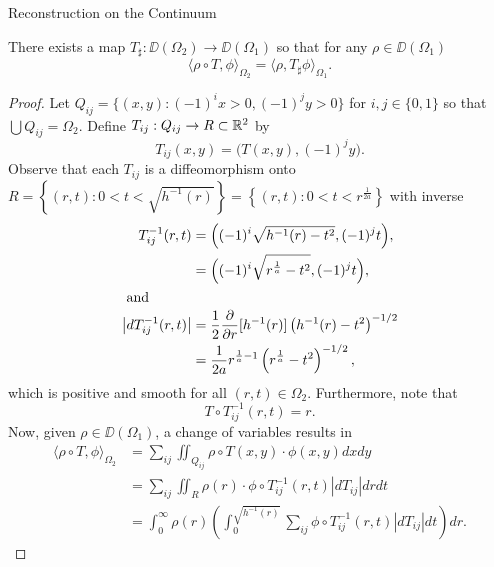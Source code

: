 \begin{chapter}{Reconstruction on the Continuum}
\begin{lem} \label{lem:existence}
  There exists a map $T_{\sharp}:\DD(\Omega_2) \to \DD(\Omega_1)$ so that for any $\rho \in \DD(\Omega_1)$
  \begin{equation}
    \langle \rho \circ T, \phi \rangle_{\Omega_2} = \langle \rho, T_\sharp \phi\rangle_{\Omega_1}.
  \end{equation}
\end{lem}
\begin{proof}
  Let $Q_{ij} = \{ (x,y): (-1)^i x>0, (-1)^jy>0\}$ for $i,j \in \{0,1\}$ so that $\bigcup Q_{ij} = \Omega_2$.
  Define $T_{ij}:Q_{ij} \to R\subset \mathbb R^2$ by 
  \begin{equation}
    T_{ij}(x,y) = \Big(T(x,y), (-1)^jy\Big). 
  \end{equation}
  Observe that each $T_{ij}$ is a diffeomorphism onto $R = \left\{(r,t): 0 < t < \sqrt{h^{-1}(r)}\right\} = \left\{(r,t): 0 < t < r^{\frac{1}{2a}}\right\}$ with inverse 
  \begin{align}
    T_{ij}^{-1}(r,t) 
      &= \Big((-1)^i\sqrt{h^{-1}(r) - t^2}, (-1)^jt\Big),\nonumber\\
      &= \Big((-1)^i\sqrt{r^{\frac 1a} - t^2}, (-1)^jt\Big),\\
    \intertext{ and }
    \left|dT_{ij}^{-1}(r,t)\right| 
      &= \frac12 \frac{\partial}{\partial r}[h^{-1}(r)]\left(h^{-1}(r) - t^2\right)^{-1/2}\nonumber \\
      &= \frac{1}{2a} r^{\frac 1a-1}\left(r^{\frac 1a} - t^2\right)^{-1/2}, \label{eq:determinant}
  \end{align}
  which is positive and smooth for all $(r,t)\in \Omega_2$.
  Furthermore, note that 
  \begin{equation}
    T \circ T_{ij}^{-1}(r,t) = r. \label{eq:partialInverseT}
  \end{equation}
  Now, given $\rho \in \DD(\Omega_1)$, a change of variables results in
  \begin{align}
    \langle \rho \circ T, \phi\rangle_{\Omega_2} 
    &= \sum_{ij}\iint_{Q_{ij}} \rho\circ T(x,y)\cdot \phi(x,y)dxdy \nonumber \\
    &= \sum_{ij}\iint_{R} \rho(r)\cdot  \phi \circ T_{ij}^{-1}(r,t)\left|dT_{ij}\right|drdt \nonumber \\
    &= \int_0^\infty \rho(r) \left(\int_0^{\sqrt{h^{-1}(r)}} \sum_{ij}\phi \circ T_{ij}^{-1}(r,t)\left|dT_{ij}\right|dt \right)dr \label{eq:phiEquation}.

\end{align}
\end{proof}
\end{chapter}
